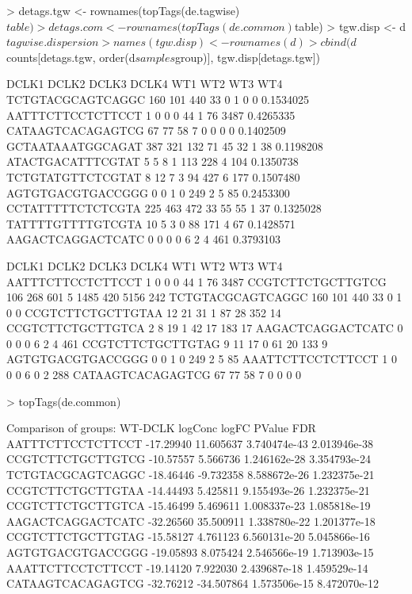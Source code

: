 \begin{Schunk}
\begin{Sinput}
> detags.tgw <- rownames(topTags(de.tagwise)$table)
> detags.com <- rownames(topTags(de.common)$table)
> tgw.disp <- d$tagwise.dispersion
> names(tgw.disp) <- rownames(d)
> cbind(d$counts[detags.tgw, order(d$samples$group)], tgw.disp[detags.tgw])
\end{Sinput}
\begin{Soutput}
                  DCLK1 DCLK2 DCLK3 DCLK4 WT1 WT2 WT3  WT4          
TCTGTACGCAGTCAGGC   160   101   440    33   0   1   0    0 0.1534025
AATTTCTTCCTCTTCCT     1     0     0     0  44   1  76 3487 0.4265335
CATAAGTCACAGAGTCG    67    77    58     7   0   0   0    0 0.1402509
GCTAATAAATGGCAGAT   387   321   132    71  45  32   1   38 0.1198208
ATACTGACATTTCGTAT     5     5     8     1 113 228   4  104 0.1350738
TCTGTATGTTCTCGTAT     8    12     7     3  94 427   6  177 0.1507480
AGTGTGACGTGACCGGG     0     0     1     0 249   2   5   85 0.2453300
CCTATTTTTCTCTCGTA   225   463   472    33  55  55   1   37 0.1325028
TATTTTGTTTTGTCGTA    10     5     3     0  88 171   4   67 0.1428571
AAGACTCAGGACTCATC     0     0     0     0   6   2   4  461 0.3793103
\end{Soutput}
\begin{Soutput}
                  DCLK1 DCLK2 DCLK3 DCLK4  WT1 WT2  WT3  WT4
AATTTCTTCCTCTTCCT     1     0     0     0   44   1   76 3487
CCGTCTTCTGCTTGTCG   106   268   601     5 1485 420 5156  242
TCTGTACGCAGTCAGGC   160   101   440    33    0   1    0    0
CCGTCTTCTGCTTGTAA    12    21    31     1   87  28  352   14
CCGTCTTCTGCTTGTCA     2     8    19     1   42  17  183   17
AAGACTCAGGACTCATC     0     0     0     0    6   2    4  461
CCGTCTTCTGCTTGTAG     9    11    17     0   61  20  133    9
AGTGTGACGTGACCGGG     0     0     1     0  249   2    5   85
AAATTCTTCCTCTTCCT     1     0     0     0    6   0    2  288
CATAAGTCACAGAGTCG    67    77    58     7    0   0    0    0
\end{Soutput}
\begin{Sinput}
> topTags(de.common)
\end{Sinput}
\begin{Soutput}
Comparison of groups: WT-DCLK 
                    logConc      logFC       PValue          FDR
AATTTCTTCCTCTTCCT -17.29940  11.605637 3.740474e-43 2.013946e-38
CCGTCTTCTGCTTGTCG -10.57557   5.566736 1.246162e-28 3.354793e-24
TCTGTACGCAGTCAGGC -18.46446  -9.732358 8.588672e-26 1.232375e-21
CCGTCTTCTGCTTGTAA -14.44493   5.425811 9.155493e-26 1.232375e-21
CCGTCTTCTGCTTGTCA -15.46499   5.469611 1.008337e-23 1.085818e-19
AAGACTCAGGACTCATC -32.26560  35.500911 1.338780e-22 1.201377e-18
CCGTCTTCTGCTTGTAG -15.58127   4.761123 6.560131e-20 5.045866e-16
AGTGTGACGTGACCGGG -19.05893   8.075424 2.546566e-19 1.713903e-15
AAATTCTTCCTCTTCCT -19.14120   7.922030 2.439687e-18 1.459529e-14
CATAAGTCACAGAGTCG -32.76212 -34.507864 1.573506e-15 8.472070e-12
\end{Soutput}
\end{Schunk}

